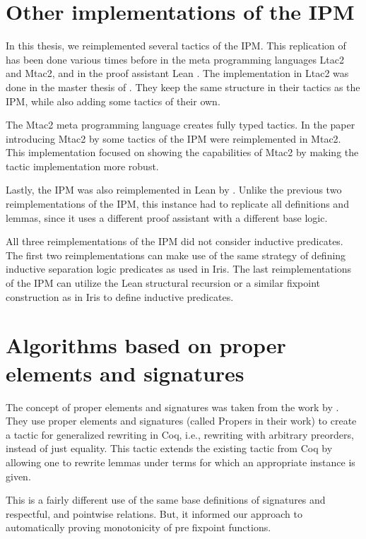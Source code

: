 \documentclass[thesis.tex]{subfiles}
\begin{document}
\section{Other implementations of the IPM}\label{sec:IPMimpl}
In this thesis, we reimplemented several tactics of the IPM. This replication of \cite{krebbersInteractiveProofsHigherorder2017} has been done various times before in the meta programming languages Ltac2 and Mtac2, and in the proof assistant Lean \cite{demouraLeanTheoremProver2015}. The implementation in Ltac2 was done in the master thesis of  \cite{liesnikovExtendingAutomatingIris2020}. They keep the same structure in their tactics as the IPM, while also adding some tactics of their own.

The Mtac2 meta programming language creates fully typed tactics. In the paper introducing Mtac2 by  \cite{kaiserMtac2TypedTactics2018} some tactics of the IPM were reimplemented in Mtac2. This implementation focused on showing the capabilities of Mtac2 by making the tactic implementation more robust.

Lastly, the IPM was also reimplemented in Lean by  \cite{koenigImprovedInterfaceInteractive2022}. Unlike the previous two reimplementations of the IPM, this instance had to replicate all definitions and lemmas, since it uses a different proof assistant with a different base logic.

All three reimplementations of the IPM did not consider inductive predicates. The first two reimplementations can make use of the same strategy of defining inductive separation logic predicates as used in Iris. The last reimplementations of the IPM can utilize the Lean structural recursion or a similar fixpoint construction as in Iris to define inductive predicates.

\section{Algorithms based on proper elements and signatures}\label{sec:propersigproj}
The concept of proper elements and signatures was taken from the work by  \cite{sozeauNewLookGeneralized2009}. They use proper elements and signatures (called Propers in their work) to create a tactic for generalized rewriting in Coq, i.e., rewriting with arbitrary preorders, instead of just equality. This tactic extends the existing  tactic from Coq by allowing one to rewrite lemmas under terms for which an appropriate  instance is given.

This is a fairly different use of the same base definitions of signatures and respectful, and pointwise relations. But, it informed our approach to automatically proving monotonicity of pre fixpoint functions.
\end{document}
